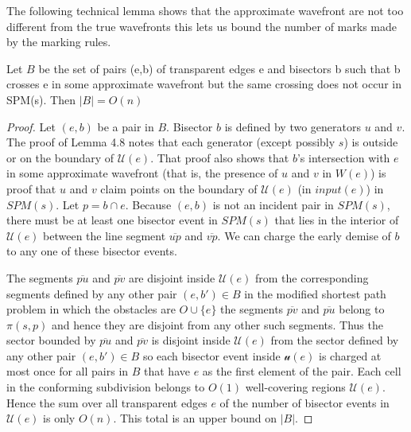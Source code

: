The following technical lemma shows that the approximate wavefront are not too
different from the true wavefronts this lets us bound the number of marks made
by the marking rules.
\begin{Lemma} \label{lemma:4.10HershbergerS99}
	Let $B$ be the set of pairs (e,b) of transparent edges e and bisectors b
	such that b crosses e in some approximate wavefront but the same crossing
	does not occur in SPM(s). Then $|B|=O(n)$
\end{Lemma}
\begin{proof}
	Let $(e,b)$ be a pair in $B$. Bisector $b$ is defined by two generators $u$
	and $v$. The proof of Lemma 4.8 notes that each generator (except possibly
	$s$) is outside or on the boundary of $\mathcal{U}(e)$. That proof also
	shows that $b$'s intersection with $e$ in some approximate wavefront (that
	is, the presence of $u$ and $v$ in $W(e)$) is proof that $u$ and $v$ claim
	points on the boundary of $\mathcal{U}(e)$ (in $input(e)$) in $SPM(s)$. Let
	$p=b \cap e$. Because $(e,b)$ is not an incident pair in $SPM(s)$, there
	must be at least one bisector event in $SPM(s)$ that lies in the interior of
	$\mathcal{U}(e)$ between the line segment $\overline{up}$ and
	$\overline{vp}$. We can charge the early demise of $b$ to any one of these
	bisector events.

	The segments $\overline{pu}$ and $\overline{pv}$ are disjoint inside
	$\mathcal{U}(e)$ from the corresponding segments defined by any other pair
	$(e,b') \in B$ in the modified shortest path problem in which the obstacles
	are $O\cup \{e\}$ the segments $\overline{pv}$ and $\overline{pu}$ belong to
	$\pi(s,p)$ and hence they are disjoint from any other such segments. Thus
	the sector bounded by $\overline{pu}$ and $\overline{pv}$ is disjoint inside
	$\mathcal{U}(e)$ from the sector defined by any other pair $(e,b') \in B$ so
	each bisector event inside $\mathcal{u}(e)$ is charged at most once for all
	pairs in $B$ that have $e$ as the first element of the pair. Each cell in
	the conforming subdivision belongs to $O(1)$ well-covering regions
	$\mathcal{U}(e)$. Hence the sum over all transparent edges $e$ of the number
	of bisector events in $\mathcal{U}(e)$ is only $O(n)$. This total is an
	upper bound on $|B|$.
\end{proof}

